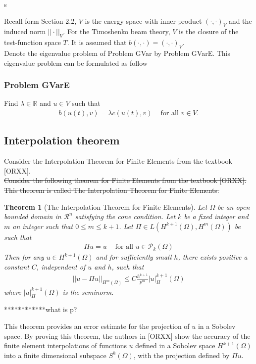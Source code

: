 s\documentclass[../../main.tex]{subfiles}
\begin{document}
Recall form Section 2.2, $V$ is the energy space with inner-product $(\cdot,\cdot)_V$ and the induced norm $||\cdot||_V$. For the Timoshenko beam theory, $V$ is the closure of the test-function space $T$. It is assumed that $b(\cdot,\cdot) = (\cdot,\cdot)_V$.\\

Denote the eigenvalue problem of Problem GVar by Problem GVarE. This eigenvalue problem can be formulated as follow

\subsubsection{Problem GVarE} Find $\lambda \in \mathbb{R}$ and $u \in V$ such that
\begin{eqnarray*}
	b(u(t),v) = \lambda c( u(t), v ) \ \ \ \ \textrm{ for all  } v\in V.
\end{eqnarray*}

\subsection{Interpolation theorem}
Consider the Interpolation Theorem for Finite Elements from the textbook [ORXX].\\

\sout{Consider the following theorem for Finite Elements from the textbook [ORXX]. This theorem is called The Interpolation Theorem for Finite Elements.}

\newtheorem*{Interpolation}{Theorem}
\begin{Interpolation}[The Interpolation Theorem for Finite Elements] 
	Let $\Omega$ be an open bounded domain in $\mathcal{R}^n$ satisfying the cone condition. Let $k$ be a fixed integer and $m$ an integer such that $0\leq m \leq k+1$. Let $\Pi \in L(H^{k+1}(\Omega), H^{m}(\Omega))$ be such that
	\begin{eqnarray}
	    \Pi u = u \ \ \ \ \textrm{ for all } u \in \mathcal{P}_k(\Omega)
	\end{eqnarray}
	Then for any $u \in H^{k+1}(\Omega)$ and for sufficiently small $h$, there exists positive a constant $C$, independent of $u$ and $h$, such that
	\begin{eqnarray}
	    ||u - \Pi u||_{H^m(\Omega)} \leq C \frac{h^{k+1}}{p^m} |u|_H^{k+1}(\Omega)
	\end{eqnarray}
	where $|u|_H^{k+1}(\Omega)$ is the seminorm.
\end{Interpolation} ************what is p?

This theorem provides an error estimate for the projection of $u$ in a Sobolev space. By proving this theorem, the authors in [ORXX] show the accuracy of the finite element interpolations of functions $u$ defined in a Sobolev space $H^{k+1}(\Omega)$ into a finite dimensional subspace $S^h(\Omega)$, with the projection defined by $\Pi u$.\\
\end{document}
